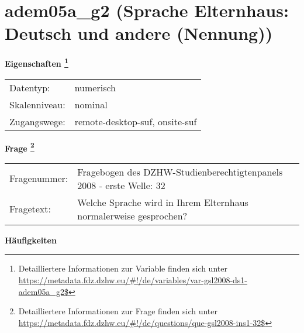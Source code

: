 
    \setcounter{footnote}{0}

    \vspace*{-1.8cm}
	\section{adem05a\_g2 (Sprache Elternhaus: Deutsch und andere (Nennung))}
	\label{section:adem05a_g2}



    \vspace*{0.5cm}
    \noindent\textbf{Eigenschaften
	\footnote{Detailliertere Informationen zur Variable finden sich unter
		\url{https://metadata.fdz.dzhw.eu/\#!/de/variables/var-gsl2008-ds1-adem05a_g2$}}}\\
	\begin{tabularx}{\hsize}{@{}lX}
	Datentyp: & numerisch \\
	Skalenniveau: & nominal \\
	Zugangswege: &
	  remote-desktop-suf, 
	  onsite-suf
 \\
    \end{tabularx}



				\vspace*{0.5cm}
                \noindent\textbf{Frage
	                \footnote{Detailliertere Informationen zur Frage finden sich unter
		              \url{https://metadata.fdz.dzhw.eu/\#!/de/questions/que-gsl2008-ins1-32$}}}\\
				\begin{tabularx}{\hsize}{@{}lX}
					Fragenummer: &
					  Fragebogen des DZHW-Studienberechtigtenpanels 2008 - erste Welle:
					  32
 \\
					Fragetext: & Welche Sprache wird in Ihrem Elternhaus normalerweise gesprochen? \\
				\end{tabularx}





        		\vspace*{0.5cm}
                \noindent\textbf{Häufigkeiten}

